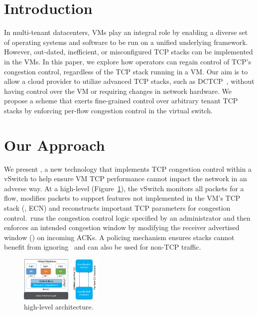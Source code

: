 \section{Introduction}
\label{section:intro}
In multi-tenant datacenters, VMs play an integral role by enabling a diverse set of operating systems and
software to be run on a unified underlying framework. However, out-dated, inefficient, 
or misconfigured TCP stacks can be implemented in the VMs. 
In this paper, we explore how operators can regain control of TCP's congestion control, 
regardless of the TCP stack
running in a VM. Our aim is to allow a cloud provider to utilize advanced TCP stacks, such as DCTCP~\cite{alizadeh2011data}, 
without having control over the VM or requiring changes in network hardware.
We propose a scheme that exerts fine-grained
control over arbitrary tenant TCP stacks by enforcing per-flow congestion
control in the virtual switch. 


\section{Our Approach}
We present \acdc{}, a new technology that implements
TCP congestion control within a vSwitch to help ensure VM
TCP performance cannot impact the network in an adverse way. At a high-level (Figure~\ref{acdc_highlevel}), the vSwitch monitors all packets for a flow, modifies
packets to support features not implemented in the VM's TCP stack (\eg{}, ECN) and reconstructs
important TCP parameters for congestion control.~\acdc runs the congestion control logic specified by an administrator and then enforces an intended
congestion window by modifying the receiver advertised window (\rwnd{}) on incoming ACKs. A policing
mechanism ensures stacks cannot benefit from ignoring~\rwnd{} and can also be used for non-TCP traffic.
\begin{figure}[!t]
        \centering
  \includegraphics[width=0.35\textwidth]{figures/acdc_highlevel_long.pdf}
        \caption{\acdc{} high-level architecture.}
        \label{acdc_highlevel}
\end{figure}

